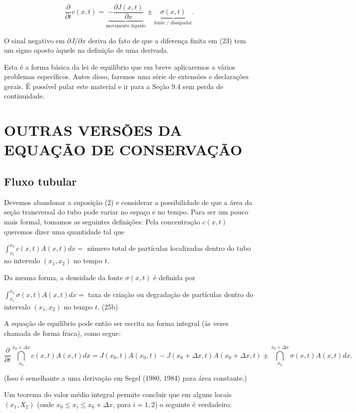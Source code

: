 $$
\dfrac{\partial}{\partial t} c(x, t) = \underbrace{-\dfrac{\partial J(x, t)}{\partial x}}_{\textrm{movimento líquido}} \pm \underbrace{\sigma(x, t)}_{\textrm{fonte / dissipador}}.
$$

O sinal negativo em $\partial J / \partial x$ deriva do fato de que a diferença finita em (23) tem um signo oposto àquele na definição de uma derivada.

Esta é a forma básica da lei de equilíbrio que em breve aplicaremos a vários problemas específicos. Antes disso, faremos uma série de extensões e declarações gerais. É possível pular este material e ir para a Seção 9.4 sem perda de continuidade.




\section{OUTRAS VERSÕES DA EQUAÇÃO DE CONSERVAÇÃO}

\subsection{Fluxo tubular}

Devemos abandonar a suposição (2) e considerar a possibilidade de que a área da seção transversal do tubo pode variar no espaço e no tempo. Para ser um pouco mais formal, tomamos as seguintes definições: Pela concentração $c(x, t)$ queremos dizer uma quantidade tal que

$\displaystyle \int_{x_1}^{x_2} c(x, t) A(x, t) dx =$ número total de partículas localizadas dentro do tubo no intervalo $(x_1, x_2)$ no tempo $t$.


Da mesma forma, a densidade da fonte $\sigma(x, t)$ é definida por

$\displaystyle \int_{x_1}^{x_2} \sigma(x, t) A(x, t) dx =$ taxa de criação ou degradação de partículas dentro do intervalo $(x_1, x_2)$ no tempo $t$.
(25b)
 
A equação de equilíbrio pode então ser escrita na forma integral (às vezes chamada de forma fraca), como segue:

$$
\dfrac{\partial}{\partial t} \dint_{x_0}^{x_0+\Delta x} c(x, t) A(x, t) dx 
=
J(x_0, t) A(x_0, t) - J(x_0 + \Delta x, t) A(x_0 + \Delta x, t) \pm \dint_{x_0}^{x_0+\Delta x} \sigma(x, t) A(x, t) dx.
$$

(Isso é semelhante a uma derivação em Segel (1980, 1984) para área constante.)

Um teorema do valor médio integral permite concluir que em alguns locais
$(x_1, X_2)$ (onde $x_0 \le x_i \le x_0 + \Delta x$, para $i = 1, 2$) o seguinte é verdadeiro:

